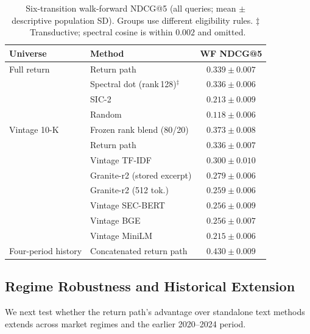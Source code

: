 \documentclass[sigconf,anonymous]{acmart}
\begin{document}
\begin{table}[t]
\caption{Six-transition walk-forward NDCG@5 (all queries; mean $\pm$
descriptive population SD).  Groups use different eligibility rules.
$\ddagger$~Transductive; spectral cosine is within $0.002$ and omitted.}
\label{tab:results}
\small\setlength{\tabcolsep}{4pt}
\begin{tabular}{llc}
\toprule
\textbf{Universe} & \textbf{Method} & \textbf{WF NDCG@5} \\
\midrule
Full return & Return path & $\mathbf{0.339\pm0.007}$ \\
            & Spectral dot (rank\,128)$^\ddagger$ & $0.336\pm0.006$ \\
            & SIC-2 & $0.213\pm0.009$ \\
            & Random & $0.118\pm0.006$ \\
\midrule
Vintage 10-K & Frozen rank blend (80/20) & $\mathbf{0.373\pm0.008}$ \\
             & Return path & $0.336\pm0.007$ \\
             & Vintage TF-IDF & $0.300\pm0.010$ \\
             & Granite-r2 (stored excerpt) & $0.279\pm0.006$ \\
             & Granite-r2 (512 tok.) & $0.259\pm0.006$ \\
             & Vintage SEC-BERT & $0.256\pm0.009$ \\
             & Vintage BGE & $0.256\pm0.007$ \\
             & Vintage MiniLM & $0.215\pm0.006$ \\
\midrule
Four-period history & Concatenated return path & $\mathbf{0.430\pm0.009}$ \\
\bottomrule
\end{tabular}
\end{table}

\subsection{Regime Robustness and Historical Extension}
\label{sec:temporal}

We next test whether the return path's advantage over standalone text methods
extends across market regimes and the earlier 2020--2024 period.
\end{document}
